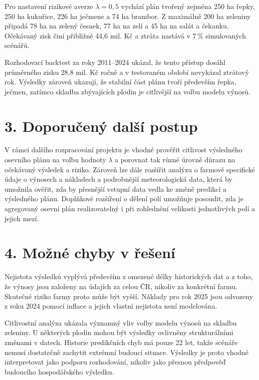\documentclass[11pt,a4paper]{article}
\begin{document}
Pro nastavení rizikové averze $\lambda=0{,}5$ vychází plán tvořený zejména
250 ha řepky, 250 ha kukuřice, 226 ha ječmene a 74 ha brambor. Z maximálně
200 ha zeleniny připadá 78 ha na zelený česnek, 77 ha na zelí a 45 ha na
salát a čekanku. Očekávaný zisk činí přibližně 44{,}6 mil. Kč a ztráta
nastává v 7\,\% simulovaných scénářů.

Rozhodovací backtest za roky 2011--2024 ukázal, že tento přístup dosáhl
průměrného zisku 28{,}8 mil. Kč ročně a v testovaném období nevykázal
ztrátový rok. Výsledky zároveň ukazují, že stabilní část plánu tvoří
především řepka, ječmen, zatímco skladba zbývajících plodin je citlivější na volbu modelu výnosů.

\vspace{-0.2cm}

\section*{3. Doporučený další postup}

V rámci dalšího rozpracování projektu je vhodné prověřit citlivost výsledného osevního plánu na volbu hodnoty $\lambda$ a porovnat tak různé úrovně důrazu na očekávaný výsledek a riziko. Zároveň lze dále rozšířit analýzu o farmově specifické údaje o výnosech a nákladech a podrobnější meteorologická data, která by umožnila ověřit, zda by přesnější vstupní data vedla ke změně predikcí a výsledného plánu. Doplňkové rozšíření o dělení polí umožňuje posoudit, zda je agregovaný osevní plán realizovatelný i při zohlednění velikosti jednotlivých polí a jejich mezí.

\vspace{-0.2cm}

\section*{4. Možné chyby v řešení}

Nejistota výsledků vyplývá především z omezené délky historických dat a z
toho, že výnosy jsou založeny na údajích za celou ČR, nikoliv za konkrétní
farmu. Skutečné riziko farmy proto může být vyšší. Náklady pro rok 2025
jsou odvozeny z roku 2024 pomocí inflace a jejich vlastní nejistota není
modelována.

Citlivostní analýza ukázala významný vliv volby modelu výnosů na skladbu
zeleniny. U některých plodin mohou být výsledky ovlivněny strukturálními
změnami v datech. Historie predikčních chyb má pouze 22 let, takže scénáře nemusí dostatečně zachytit
extrémní budoucí situace. Výsledky je proto vhodné interpretovat jako
podporu rozhodování, nikoliv jako přesnou předpověď budoucího hospodářského
výsledku.
\end{document}
